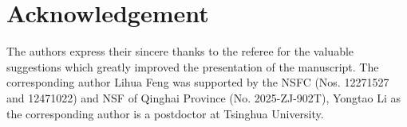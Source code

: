 \documentclass[11pt]{article}
\begin{document}




\section*{Acknowledgement}
The authors express their sincere thanks to the referee for the valuable suggestions which greatly improved the presentation of the manuscript. The corresponding author Lihua Feng was supported by the NSFC (Nos. 12271527 and 12471022) and NSF of Qinghai Province (No. 2025-ZJ-902T), Yongtao Li as the  corresponding author is a postdoctor at Tsinghua University.  
\end{document}
